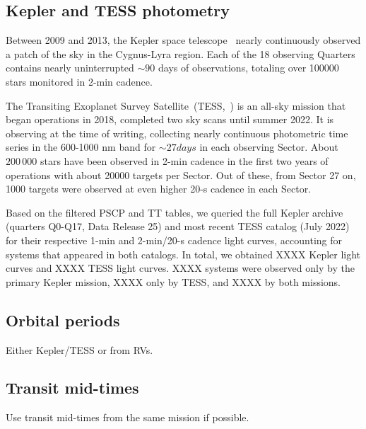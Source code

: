 \documentclass[twocolumn]{aastex631}
\begin{document}
\subsection{Kepler and TESS photometry}
Between 2009 and 2013, the Kepler space telescope~\citep{koch2010kepler} nearly continuously observed a patch of the sky in the Cygnus-Lyra region. Each of the 18 observing Quarters contains nearly uninterrupted $\sim 90$ days of observations, totaling over 100000 stars monitored in 2-min cadence. 

The Transiting Exoplanet Survey Satellite~(TESS,~\cite{ricker2015transiting}) is an all-sky mission that began operations in 2018, completed two sky scans until summer 2022. It is observing at the time of writing, collecting nearly continuous photometric time series in the 600-1000 nm band for $\sim 27 days$ in each observing Sector. About $200\,000$ stars have been observed in 2-min cadence in the first two years of operations with about 20000 targets per Sector. Out of these, from Sector 27 on, 1000 targets were observed at even higher 20-s cadence in each Sector. 

Based on the filtered PSCP and TT tables, we queried the full Kepler archive (quarters Q0-Q17, Data Release 25) and most recent TESS catalog (July 2022) for their respective 1-min and 2-min/20-s cadence light curves, accounting for systems that appeared in both catalogs. In total, we obtained XXXX Kepler light curves and XXXX TESS light curves. XXXX systems were observed only by the primary Kepler mission, XXXX only by TESS, and XXXX by both missions.


\subsection{Orbital periods}
Either Kepler/TESS or from RVs.
\subsection{Transit mid-times}
Use transit mid-times from the same mission if possible.
\end{document}
